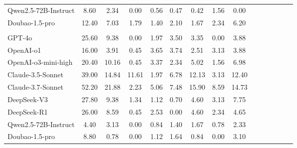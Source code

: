 \documentclass[11pt, a4paper, logo, copyright, nonumbering]{seed}
\newcommand{\mopenhands}{MopenHands\xspace}
\begin{document}
\begin{table}[ht]
{\begin{tabular}{lcccccccccccccc}
    Qwen2.5-72B-Instruct & 8.60 & 2.34 & 0.00 & 0.56 & 0.47 & 0.42 & 1.56 & 0.00 \\
    Doubao-1.5-pro & 12.40 & 7.03 & 1.79 & 1.40 & 2.10 & 1.67 & 2.34 & 6.20 \\
    \midrule
    \rowcolor{mygray}\multicolumn{9}{c}{\textbf{\mopenhands}} \\
    GPT-4o & 25.60 & 9.38 & 0.00 & 1.97 & 3.50 & 3.35 & 0.00 & 3.88 \\
    OpenAI-o1 & 16.00 & 3.91 & 0.45 & 3.65 & 3.74 & 2.51 & 3.13 & 3.88 \\
    OpenAI-o3-mini-high & 20.40 & 10.16 & 0.45 & 3.37 & 2.34 & 5.02 & 1.56 & 6.98 \\
    Claude-3.5-Sonnet & 39.00 & 14.84 & 11.61 & 1.97 & 6.78 & 12.13 & 3.13 & 12.40 \\
    Claude-3.7-Sonnet & 52.20 & 21.88 & 2.23 & 5.06 & 7.48 & 15.90 & 8.59 & 14.73 \\
    DeepSeek-V3 & 27.80 & 9.38 & 1.34 & 1.12 & 0.70 & 4.60 & 3.13 & 7.75 \\
    DeepSeek-R1 & 26.00 & 8.59 & 0.45 & 2.53 & 0.00 & 4.60 & 2.34 & 4.65 \\
    Qwen2.5-72B-Instruct & 4.40 & 3.13 & 0.00 & 0.84 & 1.40 & 1.67 & 0.78 & 2.33 \\
    Doubao-1.5-pro & 8.80 & 0.78 & 0.00 & 1.12 & 1.64 & 0.84 & 0.00 & 3.10 \\
    \bottomrule
    \end{tabular}
}
\end{table}
\end{document}
